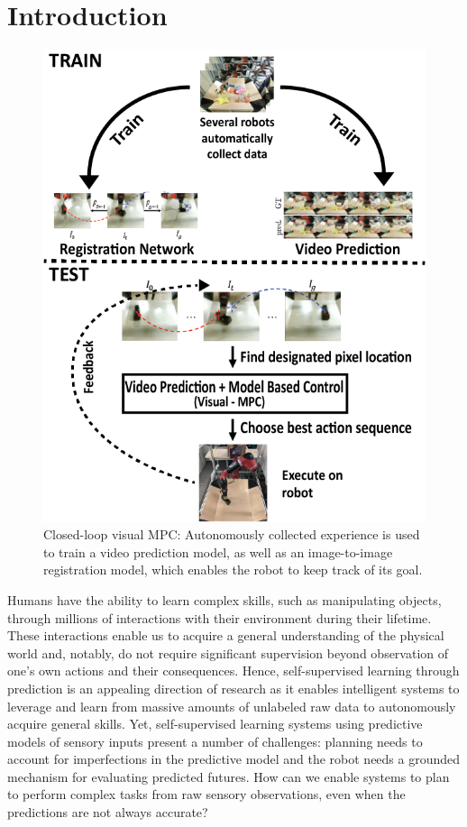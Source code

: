 \section{Introduction}

\begin{figure}
\vspace{-5mm}
\centering
\includegraphics[width=0.4\columnwidth,trim={3.2mm 0 0 0},clip]{images/new_overview}
\caption{\small{Closed-loop visual MPC: Autonomously collected experience is used to train a video prediction model, as well as an image-to-image registration model, which enables the robot to keep track of its goal.}}
\label{fig:overview}
\vspace{-0.3in}
\end{figure}

Humans have the ability to learn complex skills, such as manipulating objects, through millions of interactions with their environment during their lifetime.
These interactions enable us to acquire a general understanding of the physical world and, notably, do not require significant supervision beyond observation of one's own actions and their consequences. Hence, self-supervised learning through prediction is an appealing direction of research as it enables intelligent systems to leverage and learn from massive amounts of unlabeled raw data to autonomously acquire general skills. Yet, self-supervised learning systems using predictive models of sensory inputs present a number of challenges: planning needs to account for imperfections in the predictive model and the robot needs a grounded mechanism for evaluating predicted futures.
How can we enable systems to plan to perform complex tasks from raw sensory observations, even when the predictions are not always accurate?

